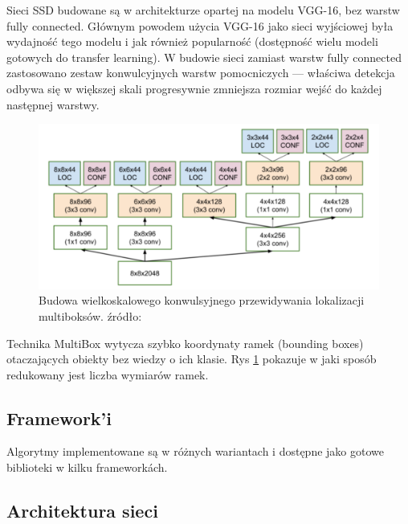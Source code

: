 Sieci SSD budowane są w architekturze opartej na modelu VGG-16, bez warstw fully connected. Głównym powodem użycia VGG-16 jako sieci wyjściowej była wydajność tego modelu i jak również popularność (dostępność wielu modeli gotowych do transfer learning). 
W budowie sieci zamiast warstw fully connected zastosowano zestaw konwulcyjnych warstw pomocniczych --- właściwa detekcja odbywa się w większej skali progresywnie zmniejsza rozmiar wejść do każdej następnej warstwy.
\begin{figure}[ht]
	\centering
	\includegraphics[width=\textwidth]{fig/ssd.pdf}
	\caption{Budowa wielkoskalowego konwulsyjnego przewidywania lokalizacji multiboksów. źródło: \cite{DBLP:journals/corr/LiuAESR15}}
	\label{fig:ssd}
\end{figure}

Technika  MultiBox wytycza szybko koordynaty ramek (bounding boxes) otaczających obiekty bez wiedzy o ich klasie. Rys \ref{fig:ssd} pokazuje w jaki sposób redukowany jest liczba wymiarów ramek.


\subsection{Framework'i}
Algorytmy implementowane są w różnych wariantach i dostępne jako gotowe biblioteki w kilku framework\'ach.

\subsection{Architektura sieci}

